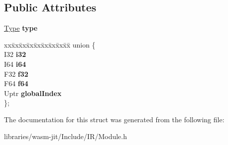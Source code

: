 \subsection*{Public Attributes}
\begin{DoxyCompactItemize}
\item 
\mbox{\label{struct_i_r_1_1_initializer_expression_a66f8d262d27a9bd6536f0268974c7dd5}} 
\mbox{\hyperlink{struct_type}{Type}} {\bfseries type}
\item 
\mbox{\label{struct_i_r_1_1_initializer_expression_a57ce8420dbc5d720a55535d33bf44ca4}} 
\begin{tabbing}
xx\=xx\=xx\=xx\=xx\=xx\=xx\=xx\=xx\=\kill
union \{\\
\>I32 {\bfseries i32}\\
\>I64 {\bfseries i64}\\
\>F32 {\bfseries f32}\\
\>F64 {\bfseries f64}\\
\>Uptr {\bfseries globalIndex}\\
\}; \\

\end{tabbing}\end{DoxyCompactItemize}


The documentation for this struct was generated from the following file\+:\begin{DoxyCompactItemize}
\item 
libraries/wasm-\/jit/\+Include/\+I\+R/Module.\+h\end{DoxyCompactItemize}
